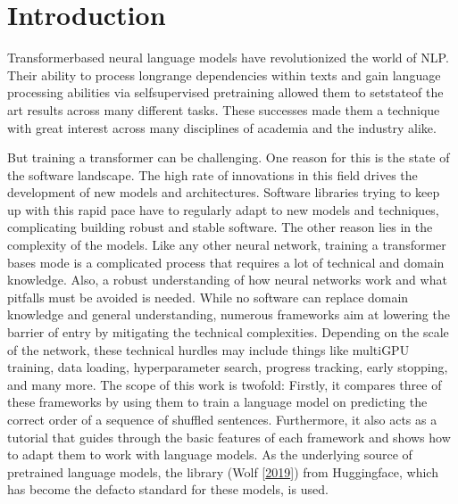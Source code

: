 \documentclass[letterpaper,10pt,english]{jupyterBook}
\begin{document}
\chapter{Introduction}
\label{\detokenize{Introduction:introduction}}\label{\detokenize{Introduction::doc}}
\sphinxAtStartPar
Transformer\sphinxhyphen{}based neural language models have revolutionized the world of NLP.
Their ability to process long\sphinxhyphen{}range dependencies within texts and gain language processing abilities via self\sphinxhyphen{}supervised pretraining allowed them to set\sphinxhyphen{}state\sphinxhyphen{}of the art results across many different tasks.
These successes made them a technique with great interest across many disciplines of academia and the industry alike.

\sphinxAtStartPar
But training a transformer can be challenging.
One reason for this is the state of the software landscape.
The high rate of innovations in this field drives the development of new models and architectures.
Software libraries trying to keep up with this rapid pace have to regularly adapt to new models and techniques, complicating building robust and stable software.
The other reason lies in the complexity of the models.
Like any other neural network, training a transformer bases mode is a complicated process that requires a lot of technical and domain knowledge.
Also, a robust understanding of how neural networks work and what pitfalls must be avoided is needed.
While no software can replace domain knowledge and general understanding, numerous frameworks aim at lowering the barrier of entry by mitigating the technical complexities.
Depending on the scale of the network, these technical hurdles may include things like multi\sphinxhyphen{}GPU training, data loading, hyperparameter search, progress tracking, early stopping, and many more.
The scope of this work is two\sphinxhyphen{}fold: Firstly, it compares three of these frameworks by using them to train a language model on predicting the correct order of a sequence of shuffled sentences.
Furthermore, it also acts as a tutorial that guides through the basic features of each framework and shows how to adapt them to work with language models.
As the underlying source of pretrained language models, the  library (Wolf  {[}\hyperlink{cite.Bibliography:id10}{2019}{]}) from Huggingface, which has become the de\sphinxhyphen{}facto standard for these models, is used.
\end{document}
